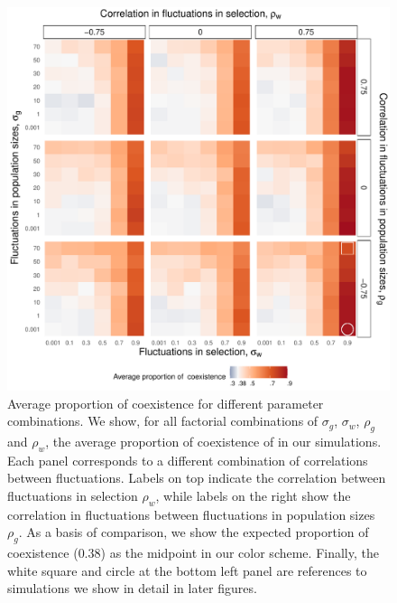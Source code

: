 \documentclass[12pt]{article}
\begin{document}
\clearpage

\begin{figure}[H]
  \centerline{\includegraphics[width=1\textwidth]{heat_map.pdf}}
  \caption{Average proportion of coexistence for different parameter combinations. We show, for all factorial combinations of $\sigma_{g}$, $\sigma_{w}$, $\rho_{g}$ and $\rho_{w}$, the average proportion of coexistence of  in our simulations. Each panel corresponds to a different combination of correlations between fluctuations. Labels on top indicate the correlation between fluctuations in selection $\rho_{w}$, while labels on the right show the correlation in fluctuations between fluctuations in population sizes $\rho_{g}$.  As a basis of comparison, we show the expected proportion of coexistence ($ 0.38$) as the midpoint in our color scheme. Finally, the white square and circle at the bottom left panel are references to simulations we show in detail in later figures.   }
    \label{fig:heat}
\end{figure}


\clearpage
\end{document}
